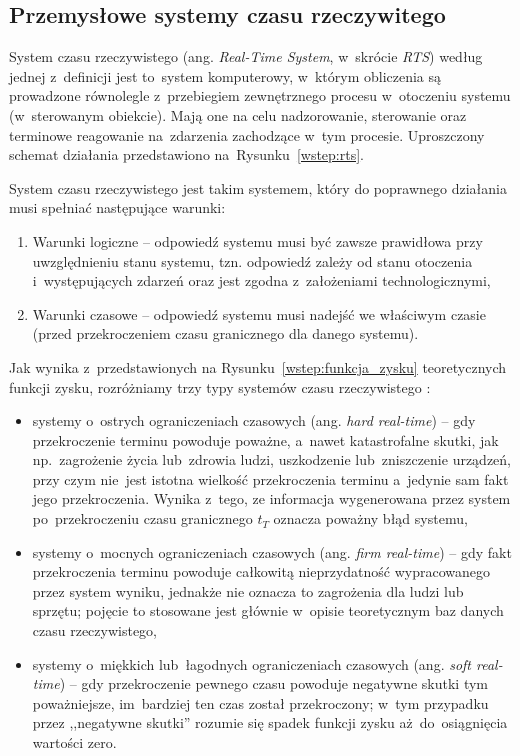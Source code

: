 \subsection{Przemysłowe systemy czasu rzeczywitego}
System czasu rzeczywistego (ang. \textit{Real-Time System}, w~skrócie \textit{RTS}) według jednej z~definicji jest to~system komputerowy, w~którym obliczenia są prowadzone równolegle z~przebiegiem zewnętrznego procesu w~otoczeniu systemu (w~sterowanym obiekcie). Mają one na celu nadzorowanie, sterowanie oraz terminowe reagowanie na~zdarzenia zachodzące w~tym procesie. Uproszczony schemat działania przedstawiono na~Rysunku~\ref{wstep:rts}.
\vspace{-3mm}

System czasu rzeczywistego jest takim systemem, który do poprawnego działania musi spełniać następujące warunki:
\begin{enumerate}
\item Warunki logiczne -- odpowiedź systemu musi być zawsze prawidłowa przy uwzględnieniu stanu systemu, tzn. odpowiedź zależy od stanu otoczenia i~występujących zdarzeń oraz jest zgodna z~założeniami technologicznymi,
\item Warunki czasowe -- odpowiedź systemu musi nadejść we właściwym czasie (przed przekroczeniem czasu granicznego dla danego systemu).
\end{enumerate}


Jak wynika z~przedstawionych na Rysunku~\ref{wstep:funkcja_zysku} teoretycznych funkcji zysku, rozróżniamy trzy typy systemów czasu rzeczywistego \cite{kwiecien,gaj,rts}:
\begin{itemize}
\item systemy o~ostrych ograniczeniach czasowych (ang. \textit{hard real-time}) -- gdy przekroczenie terminu powoduje poważne, a~nawet katastrofalne skutki, jak np.~zagrożenie życia lub~zdrowia ludzi, uszkodzenie lub~zniszczenie urządzeń, przy czym nie~jest istotna wielkość przekroczenia terminu a~jedynie sam fakt jego przekroczenia. Wynika z~tego, ze informacja wygenerowana przez system po~przekroczeniu czasu granicznego $t_T$ oznacza poważny błąd systemu,

\item systemy o~mocnych ograniczeniach czasowych (ang. \textit{firm real-time}) -- gdy fakt przekroczenia terminu powoduje całkowitą nieprzydatność wypracowanego przez system wyniku, jednakże nie oznacza to zagrożenia dla ludzi lub sprzętu; pojęcie to stosowane jest głównie w~opisie teoretycznym baz danych czasu rzeczywistego,

\item systemy o~miękkich lub~łagodnych ograniczeniach czasowych (ang. \textit{soft real-time}) -- gdy przekroczenie pewnego czasu powoduje negatywne skutki tym poważniejsze, im~bardziej ten czas został przekroczony; w~tym przypadku przez ,,negatywne skutki'' rozumie się spadek funkcji zysku aż~do~osiągnięcia wartości zero.
\end{itemize}

